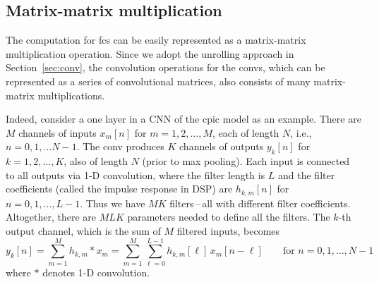 \documentclass{article}
\begin{document}
\subsection{Matrix-matrix multiplication}
\label{sec:mmm}
%
%
The computation for \glspl{fc} can be easily represented as a matrix-matrix multiplication operation.
Since we adopt the unrolling approach in Section~\ref{sec:conv}, the convolution operations for the \glspl{conv}, which can be represented as a series of convolutional matrices, also consists of many matrix-matrix multiplications.

Indeed, consider a one layer in a CNN of the \gls{cpic} model as an example.
There are $M$ channels of inputs $x_m[n]$ for $m=1,2,\ldots, M$, each of length $N$, i.e., $n=0,1,\ldots N-1$.
The \gls{conv} produces $K$ channels of outputs $y_k[n]$ for $k=1,2,\ldots, K$, also of length $N$ (prior to max pooling).
Each input is connected to all outputs via 1-D convolution, where the filter length is $L$ and the filter coefficients (called the impulse response in DSP) are $h_{k,m}[n]$ for $n=0,1,\ldots, L-1$.
Thus we have $MK$ filters\,--\,all with different filter coefficients.
Altogether, there are $MLK$ parameters needed to define all the filters.
The $k$-th output channel, which is the sum of $M$ filtered inputs, becomes
\begin{equation}
y_k[n] = \sum\limits_{m=1}^{M} h_{k,m} \ast x_m
 = \sum\limits_{m=1}^{M} \sum\limits_{\ell=0}^{L-1} h_{k,m}[\ell]\, x_m[n-\ell]
\qquad\text{for\ } n=0,1,\ldots,N-1
\label{eq:conv_gemm}
\end{equation}
where $\ast$ denotes 1-D convolution.
\end{document}
